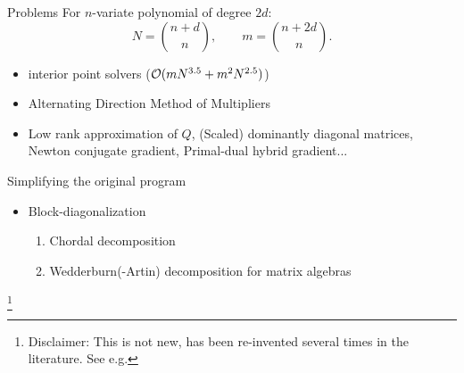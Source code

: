 \begin{frame}{Problems}
  For $n$-variate polynomial of degree $2d$:
  \[N = {n + d \choose n},\qquad m = {n + 2d \choose n}.\]
  \pause
  \vspace*{-0.3in}
  \begin{itemize}
    \item interior point solvers ($\mathcal{O}(mN^{3.5} + m^2N^{2.5})$)\\
    \item Alternating Direction Method of Multipliers\\
    \item Low rank approximation of $Q$, (Scaled) dominantly diagonal matrices, Newton conjugate gradient, Primal-dual hybrid gradient...
  \end{itemize}

\end{frame}


\begin{frame}{Simplifying the original program}

\begin{itemize}
  \item Block-diagonalization \\
  \begin{enumerate}
    \item Chordal decomposition 
    \item Wedderburn(-Artin) decomposition for matrix algebras \\
  \end{enumerate}
\end{itemize}
\pause

\vspace*{0.3in}
\footnote[]{\tiny
Disclaimer: This is not new, has been re-invented several times in the literature. See e.g. \gatpar
}


\end{frame}

